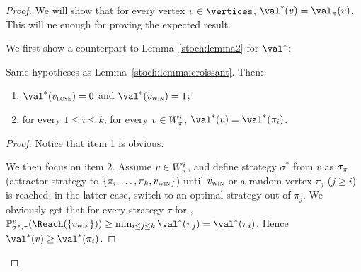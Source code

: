 \begin{proof}
  We will show that for every vertex $v \in \vertices$, $\val^*(v) =
  \val_\perm(v)$. This will ne enough for proving the expected result.

  We first show a counterpart to Lemma~\ref{stoch:lemma2} for
  $\val^*$:
  \begin{lemma}
    Same hypotheses as Lemma~\ref{stoch:lemma:croissant}. Then:
    \begin{enumerate}
    \item $\val^*(\vlose) = 0$ and $\val^*(\vwin) = 1$;
    \item for every $1 \le i \le k$, for every $v \in W_\pi^i$,
      $\val^*(v) = \val^*(\perm_i)$.
    \end{enumerate}
  \end{lemma}

  \begin{proof}
    Notice that item 1 is obvious. 

    We then focus on item 2.  Assume $v \in W_\pi^i$, and define
    strategy $\sigma^*$ from $v$ as $\sigma_\pi$ (attractor strategy
    to $\{\pi_i,\ldots,\pi_k,v_{\textsc{win}}\}$) until $v_{\textsc{win}}$ or a random
    vertex $\pi_j$ ($j \ge i$) is reached; in the latter case, switch
    to an optimal strategy out of $\pi_j$. We obviously get that for
    every strategy $\tau$ for \Adam,
    $\probm_{\sigma^*,\tau}^v(\Reach(\{\vwin\})) \ge \min_{i \le j \le
      k}\val^*(\perm_j) = \val^*(\perm_i)$. Hence $\val^*(v) \ge
    \val^*(\perm_i)$.
    

\end{proof}
\end{proof}
